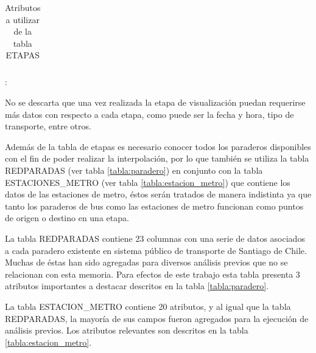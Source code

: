 \documentclass[12pt]{article}
\begin{document}
\begin{table}[h]
\begin{center}
\begin{tabular}{| l | p{7cm} |}
  \end{tabular}
\end{center}
\caption{Atributos a utilizar de la tabla ETAPAS}:
\label{tabla:etapa}
\end{table}

No se descarta que una vez realizada la etapa de visualización puedan requerirse más datos con respecto a cada etapa, como puede ser la fecha y hora, tipo de transporte, entre otros.

Además de la tabla de etapas es necesario conocer todos los paraderos disponibles con el fin de poder realizar la interpolación, por lo que también se utiliza la tabla REDPARADAS (ver tabla \ref{tabla:paradero}) en conjunto con la tabla ESTACIONES\_METRO (ver tabla \ref{tabla:estacion_metro}) que contiene los datos de las estaciones de metro, éstos serán tratados de manera indistinta ya que tanto los paraderos de bus como las estaciones de metro funcionan como puntos de origen o destino en una etapa.

La tabla REDPARADAS contiene 23 columnas con una serie de datos asociados a cada paradero existente en sistema público de transporte de Santiago de Chile. Muchas de éstas han sido agregadas para diversos análisis previos que no se relacionan con esta memoria. Para efectos de este trabajo esta tabla presenta 3 atributos importantes a destacar descritos en la tabla \ref{tabla:paradero}. 

La tabla ESTACION\_METRO contiene 20 atributos, y al igual que la tabla REDPARADAS, la mayoría de sus campos fueron agregados para la ejecución de análisis previos. Los atributos relevantes son descritos en la tabla \ref{tabla:estacion_metro}.
\end{document}

